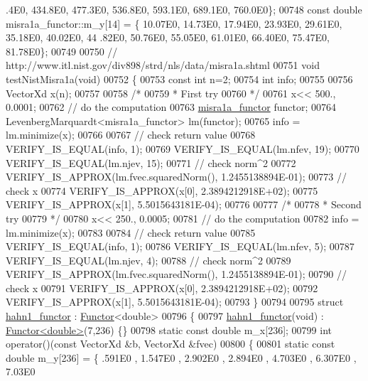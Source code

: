 \begin{DoxyCode}
      .4E0, 434.8E0, 477.3E0, 536.8E0, 593.1E0, 689.1E0, 760.0E0\};
00748 \textcolor{keyword}{const} \textcolor{keywordtype}{double} misra1a\_functor::m\_y[14] = \{ 10.07E0, 14.73E0, 17.94E0, 23.93E0, 29.61E0, 35.18E0, 40.02E0, 44
      .82E0, 50.76E0, 55.05E0, 61.01E0, 66.40E0, 75.47E0, 81.78E0\};
00749 
00750 \textcolor{comment}{// http://www.itl.nist.gov/div898/strd/nls/data/misra1a.shtml}
00751 \textcolor{keywordtype}{void} testNistMisra1a(\textcolor{keywordtype}{void})
00752 \{
00753   \textcolor{keyword}{const} \textcolor{keywordtype}{int} n=2;
00754   \textcolor{keywordtype}{int} info;
00755 
00756   VectorXd x(n);
00757 
00758   \textcolor{comment}{/*}
00759 \textcolor{comment}{   * First try}
00760 \textcolor{comment}{   */}
00761   x<< 500., 0.0001;
00762   \textcolor{comment}{// do the computation}
00763   \hyperlink{structmisra1a__functor}{misra1a\_functor} functor;
00764   LevenbergMarquardt<misra1a\_functor> lm(functor);
00765   info = lm.minimize(x);
00766 
00767   \textcolor{comment}{// check return value}
00768   VERIFY\_IS\_EQUAL(info, 1);
00769   VERIFY\_IS\_EQUAL(lm.nfev, 19);
00770   VERIFY\_IS\_EQUAL(lm.njev, 15);
00771   \textcolor{comment}{// check norm^2}
00772   VERIFY\_IS\_APPROX(lm.fvec.squaredNorm(), 1.2455138894E-01);
00773   \textcolor{comment}{// check x}
00774   VERIFY\_IS\_APPROX(x[0], 2.3894212918E+02);
00775   VERIFY\_IS\_APPROX(x[1], 5.5015643181E-04);
00776 
00777   \textcolor{comment}{/*}
00778 \textcolor{comment}{   * Second try}
00779 \textcolor{comment}{   */}
00780   x<< 250., 0.0005;
00781   \textcolor{comment}{// do the computation}
00782   info = lm.minimize(x);
00783 
00784   \textcolor{comment}{// check return value}
00785   VERIFY\_IS\_EQUAL(info, 1);
00786   VERIFY\_IS\_EQUAL(lm.nfev, 5);
00787   VERIFY\_IS\_EQUAL(lm.njev, 4);
00788   \textcolor{comment}{// check norm^2}
00789   VERIFY\_IS\_APPROX(lm.fvec.squaredNorm(), 1.2455138894E-01);
00790   \textcolor{comment}{// check x}
00791   VERIFY\_IS\_APPROX(x[0], 2.3894212918E+02);
00792   VERIFY\_IS\_APPROX(x[1], 5.5015643181E-04);
00793 \}
00794 
00795 \textcolor{keyword}{struct }\hyperlink{structhahn1__functor}{hahn1\_functor} : \hyperlink{struct_functor}{Functor}<double>
00796 \{
00797     \hyperlink{structhahn1__functor}{hahn1\_functor}(\textcolor{keywordtype}{void}) : \hyperlink{struct_functor}{Functor<double>}(7,236) \{\}
00798     \textcolor{keyword}{static} \textcolor{keyword}{const} \textcolor{keywordtype}{double} m\_x[236];
00799     \textcolor{keywordtype}{int} operator()(\textcolor{keyword}{const} VectorXd &b, VectorXd &fvec)
00800     \{
00801         \textcolor{keyword}{static} \textcolor{keyword}{const} \textcolor{keywordtype}{double} m\_y[236] = \{ .591E0 , 1.547E0 , 2.902E0 , 2.894E0 , 4.703E0 , 6.307E0 , 7.03E0 

\end{DoxyCode}
